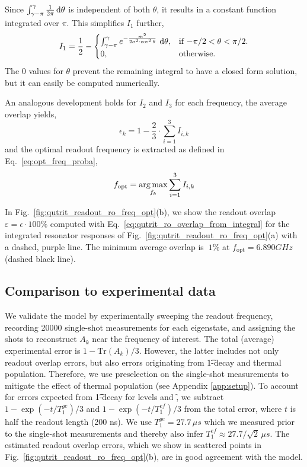 Since $\int_{\gamma - \pi}^{\gamma}{\frac{1}{2\pi}\,\mathrm d\theta}$ is independent of both $\theta$, it results in a constant function integrated over $\pi$. This simplifies $I_1$ further,
\begin{equation} \label{eq:final_frequency_I_integral}
    I_1 = \frac{1}{2} - 
    \begin{cases}
    \int_{\gamma - \pi}^{\gamma}{e^{-\frac{m^2}{2 \sigma^2 \cdot \cos^2{\theta}}}\,\,\mathrm d\theta}, & \text{if $-\pi/2<\theta<\pi/2$}.\\
    0, & \text{otherwise}.
  \end{cases}
\end{equation}
The 0 values for $\theta$ prevent the remaining integral to have a closed form solution, but it can easily be computed numerically. 

An analogous development holds for $I_2$ and $I_3$ for each frequency, the average overlap yields,
\begin{equation} \label{eq:qutrit_ro_overlap_from_integral}
    \epsilon_k = 1 - \frac{2}{3}\cdot \sum_{i=1}^{3}{I_{i,k}}
\end{equation}
and the optimal readout frequency is extracted as defined in Eq.~\eqref{eq:opt_freq_proba},
\begin{equation} \label{eq:optimal_freq}
    f_{\mathrm{opt}} = \operatorname*{arg\,max}_{f_k} {\sum_{i=1}^{3}{I_{i,k}}}
\end{equation}

In Fig.~\ref{fig:qutrit_readout_ro_freq_opt}(b), we show the readout overlap $\varepsilon = \epsilon\cdot 100\%$ computed with Eq.~\eqref{eq:qutrit_ro_overlap_from_integral} for the integrated resonator responses of Fig.~\ref{fig:qutrit_readout_ro_freq_opt}(a) with a dashed, purple line. The minimum average overlap is $~1\unit{\%}$ at $f_{\mathrm{opt}} = 6.890\unit{GHz}$ (dashed black line). 

\subsection{Comparison to experimental data}
We validate the model by experimentally sweeping the readout frequency, recording 20000 single-shot measurements for each eigenstate, and assigning the shots to reconstruct $A_k$ near the frequency of interest. The total (average) experimental error is $1-\mathrm{Tr}\left(A_k\right)/3$. However, the latter includes not only readout overlap errors, but also errors originating from \t{1}-decay and thermal population. Therefore, we use preselection on the single-shot measurements to mitigate the effect of thermal population (see Appendix \ref{app:setup}). To account for errors expected from \t{1}-decay for levels \e{} and \f, we subtract $1-\exp{\left(-t/T_1^{ge}\right)}/3$ and $1-\exp{\left(-t/T_1^{ef}\right)}/3$ from the total error, where $t$ is half the readout length (200 ns). We use $T_1^{ge} = 27.7\, \mu s$ which we measured prior to the single-shot measurements and thereby also infer $T_1^{ef} \approx 27.7 / \sqrt{2}\, \mu s$. The estimated readout overlap errors, which we show in scattered points in Fig.~\ref{fig:qutrit_readout_ro_freq_opt}(b), are in good agreement with the model.

